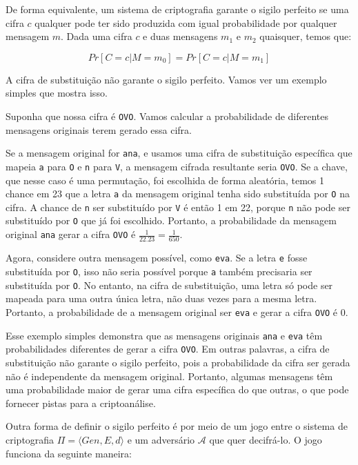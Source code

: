 De forma equivalente, um sistema de criptografia garante o sigilo perfeito se uma cifra $c$ qualquer pode ter sido produzida com igual probabilidade por qualquer mensagem $m$.
Dada uma cifra $c$ e duas mensagens $m_1$ e $m_2$ quaisquer, temos que:

\begin{displaymath}
  Pr[C = c | M = m_0] = Pr[C = c | M = m_1]
\end{displaymath}


A cifra de substituição não garante o sigilo perfeito. Vamos ver um exemplo simples que mostra isso.

Suponha que nossa cifra é {\tt OVO}.
Vamos calcular a probabilidade de diferentes mensagens originais terem gerado essa cifra.

Se a mensagem original for {\tt ana}, e usamos uma cifra de substituição específica que mapeia {\tt a} para {\tt O} e {\tt n} para {\tt V}, a mensagem cifrada resultante seria {\tt OVO}.
Se a chave, que nesse caso é uma permutação, foi escolhida de forma aleatória, temos 1 chance em 23 que a letra {\tt a} da mensagem original tenha sido substituída por {\tt O} na cifra.
A chance de {\tt n} ser substituído por {\tt V} é então 1 em 22, porque {\tt n} não pode ser substituído por {\tt O} que já foi escolhido.
Portanto, a probabilidade da mensagem original {\tt ana} gerar a cifra {\tt OVO} é $\frac{1}{22.23} = \frac{1}{650}$.

Agora, considere outra mensagem possível, como {\tt eva}.
Se a letra {\tt e} fosse substituída por {\tt O}, isso não seria possível porque {\tt a} também precisaria ser substituída por {\tt O}.
No entanto, na cifra de substituição, uma letra só pode ser mapeada para uma outra única letra, não duas vezes para a mesma letra.
Portanto, a probabilidade de a mensagem original ser {\tt eva} e gerar a cifra {\tt OVO} é 0.

Esse exemplo simples demonstra que as mensagens originais {\tt ana} e {\tt eva} têm probabilidades diferentes de gerar a cifra {\tt OVO}.
Em outras palavras, a cifra de substituição não garante o sigilo perfeito, pois a probabilidade da cifra ser gerada não é independente da mensagem original.
Portanto, algumas mensagens têm uma probabilidade maior de gerar uma cifra específica do que outras, o que pode fornecer pistas para a criptoanálise.

Outra forma de definir o sigilo perfeito é por meio de um jogo entre o sistema de criptografia $\Pi = \langle Gen, E, d \rangle$ e um adversário $\mathcal{A}$ que quer decifrá-lo.
O jogo funciona da seguinte maneira:

